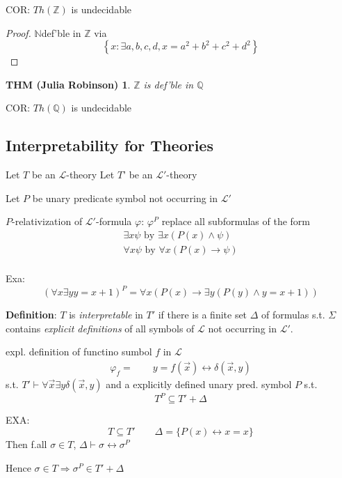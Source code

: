 \documentclass[12pt]{article}
\newcommand{\Nat}{\ensuremath{\mathbb{N}}}
\newcommand{\Integer}{\ensuremath{\mathbb{Z}}}
\newcommand{\Rat}{\ensuremath{\mathbb{Q}}}
\newcommand{\proves}{\vdash}
\newcommand{\defn}{\textbf{Definition}: }
\begin{document}
  COR: $Th(\Integer)$ is undecidable
\begin{proof}
  \Nat def'ble in $\Integer$ via
  \[
  \left\{ x : \exists a,b,c,d, x = a^2 + b^2 + c^2 + d^2 \right\}
  \]
\end{proof}

\newtheorem*{julia}{THM (Julia Robinson)}
\begin{julia}
  $\Integer$ is def'ble in $\Rat$
\end{julia}
COR: $Th(\Rat)$ is undecidable

\subsection*{Interpretability for Theories}
Let $T$ be an $\mathcal{L}$-theory 
Let $T$' be an $\mathcal{L}'$-theory 

Let $P$ be unary predicate symbol not occurring in $\mathcal{L}'$

$P$-relativization of $\mathcal{L}'$-formula $\varphi$: $\varphi^P$
replace all subformulas of the form
\begin{align*}
  \exists x \psi \text{ by } \exists x (P(x) \wedge \psi) \\
  \forall x \psi \text{ by } \forall x (P(x) \rightarrow \psi) \\
\end{align*}

Exa:
\[
\left( \forall x \exists y y = x+1 \right)^P =
        \forall x \left( P(x) \rightarrow \exists y (P(y) \wedge y = x+1) \right)
\]

\defn $T$ is \emph{interpretable} in $T'$
if there is a finite set $\Delta$ of formulas s.t. 
$\Sigma$ contains \emph{explicit definitions} of all symbols of $\mathcal{L}$
not occurring in $\mathcal{L}'$.

expl. definition of functino sumbol $f$ in $\mathcal{L}$
\begin{align*}
  \varphi_f = \qquad y = f(\vec{x}) \leftrightarrow \delta(\vec{x}, y)
\end{align*}                                      %
s.t. $T' \proves \forall \vec{x} \exists y \delta(\vec{x}, y)$
%
and a explicitly defined unary pred. symbol $P$ s.t.
\[
T^P \subseteq T' + \Delta
\]          %

EXA: 
\[
T \subseteq T'
\qquad
\Delta = \{ P(x) \leftrightarrow x=x \}
\]
Then f.all $\sigma \in T$, $\Delta \proves \sigma \leftrightarrow \sigma^P$

Hence $\sigma \in T \Rightarrow \sigma^P \in T' + \Delta$
\end{document}
